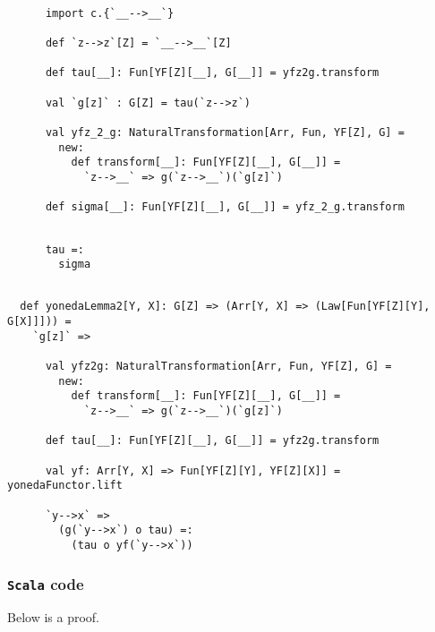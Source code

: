 \documentclass[11pt]{article}
\newcommand{\code}{\subsubsection{{\tt Scala} code}\begingroup\rm \vspace{12pt}}
\def\edefn{\endgroup\par\pagebreak[2]\addvspace{\medskipamount}}
\let\ecode=\edefn
\begin{document}
\vspace{6pt}
\begin{mdframed}[backgroundcolor=lightgray!20] 
\begin{lstlisting}

      import c.{`__-->__`}

      def `z-->z`[Z] = `__-->__`[Z]

      def tau[__]: Fun[YF[Z][__], G[__]] = yfz2g.transform

      val `g[z]` : G[Z] = tau(`z-->z`)

      val yfz_2_g: NaturalTransformation[Arr, Fun, YF[Z], G] =
        new:
          def transform[__]: Fun[YF[Z][__], G[__]] =
            `z-->__` => g(`z-->__`)(`g[z]`)

      def sigma[__]: Fun[YF[Z][__], G[__]] = yfz_2_g.transform
\end{lstlisting}
\end{mdframed}
\vspace{6pt}
\begin{mdframed}[backgroundcolor=lightgray!20] 
\begin{lstlisting}

      tau =:
        sigma
\end{lstlisting}
\end{mdframed}
\vspace{6pt}
\clearpage
\begin{mdframed}[backgroundcolor=lightgray!20] 
\begin{lstlisting}

  def yonedaLemma2[Y, X]: G[Z] => (Arr[Y, X] => (Law[Fun[YF[Z][Y], G[X]]])) =
    `g[z]` =>

      val yfz2g: NaturalTransformation[Arr, Fun, YF[Z], G] =
        new:
          def transform[__]: Fun[YF[Z][__], G[__]] =
            `z-->__` => g(`z-->__`)(`g[z]`)

      def tau[__]: Fun[YF[Z][__], G[__]] = yfz2g.transform

      val yf: Arr[Y, X] => Fun[YF[Z][Y], YF[Z][X]] = yonedaFunctor.lift

      `y-->x` =>
        (g(`y-->x`) o tau) =:
          (tau o yf(`y-->x`))
\end{lstlisting}
\end{mdframed}    
\ecode

\code
Below is a proof.
\end{document}
